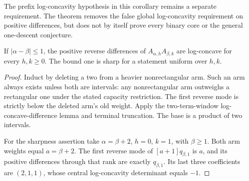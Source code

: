 The prefix log-concavity hypothesis in this corollary remains a
separate requirement. The theorem removes the false global
log-concavity requirement on positive differences, but does not
by itself prove every binary core or the general one-descent
conjecture.

\begin{proposition}
If $|\alpha-\beta|\le1$, the positive reverse differences of
$A_{\alpha,h}A_{\beta,k}$ are log-concave for every $h,k\ge0$.
The bound one is sharp for a statement uniform over $h,k$.
\end{proposition}
\begin{proof}
Induct by deleting a two from a heavier nonrectangular arm.
Such an arm always exists unless both are intervals: any
nonrectangular arm outweighs a rectangular one under the stated
capacity restriction. The first reverse mode is strictly below
the deleted arm's old weight. Apply the two-term-window
log-concave-difference lemma and terminal truncation. The base
is a product of two intervals.

For the sharpness assertion take $\alpha=\beta+2$, $h=0$, $k=1$,
with $\beta\ge1$. Both arm weights equal $a=\beta+2$. The first
reverse mode of $[a+1]q_{\beta,1}$ is $a$, and its positive
differences through that rank are exactly $q_{\beta,1}$.
Its last three coefficients are $(2,1,1)$, whose central
log-concavity determinant equals $-1$.
\end{proof}
